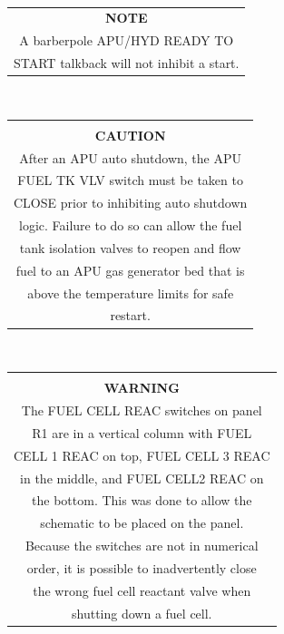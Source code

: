 \documentclass[13pt, letter,final]{article}
\begin{document}
\begin{multicols}{2}
\\
\begin{tabular}{c}
	\bfseries NOTE\\[0.3cm] A barberpole APU/HYD READY TO\\ START talkback will not inhibit a start.
\end{tabular}
\\[0.5cm]
\begin{tabular}{|c|}
	\hline
	\\[0.1cm]
	\bfseries CAUTION\\[0.3cm] After an APU auto shutdown, the APU\\ FUEL TK VLV switch must be taken to\\ CLOSE prior to inhibiting auto shutdown\\ logic. Failure to do so can allow the fuel\\ tank isolation valves to reopen and flow\\ fuel to an APU gas generator bed that is\\ above the temperature limits for safe\\ restart.\\
	\hline
\end{tabular}
\\[0.5cm]
\begin{tabular}{||c||}
	\hline \hline\\
	\bfseries WARNING\\[0.3cm] The FUEL CELL REAC switches on panel\\ R1 are in a vertical column with FUEL\\ CELL 1 REAC on top, FUEL CELL 3 REAC\\ in the middle, and FUEL CELL2 REAC on\\ the bottom. This was done to allow the\\ schematic to be placed on the panel.\\ Because the switches are not in numerical\\ order, it is possible to inadvertently close\\ the wrong fuel cell reactant valve when\\ shutting down a fuel cell.\\
	\hline \hline
\end{tabular}
\\
\end{multicols}

\newpage
\tableofcontents
\newpage
\end{document}
